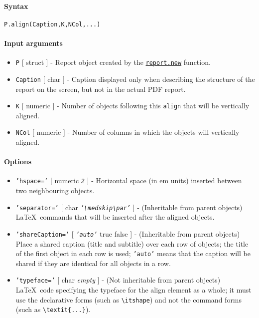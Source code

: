 


	\paragraph{Syntax}

\begin{verbatim}
P.align(Caption,K,NCol,...)
\end{verbatim}

\paragraph{Input arguments}

\begin{itemize}
\item
  \texttt{P} {[} struct {]} - Report object created by the
  \href{report/new}{\texttt{report.new}} function.
\item
  \texttt{Caption} {[} char {]} - Caption displayed only when describing
  the structure of the report on the screen, but not in the actual PDF
  report.
\item
  \texttt{K} {[} numeric {]} - Number of objects following this
  \texttt{align} that will be vertically aligned.
\item
  \texttt{NCol} {[} numeric {]} - Number of columns in which the objects
  will vertically aligned.
\end{itemize}

\paragraph{Options}

\begin{itemize}
\item
  \texttt{'hspace='} {[} numeric \textbar{} \emph{\texttt{2}} {]} -
  Horizontal space (in em units) inserted between two neighbouring
  objects.
\item
  \texttt{'separator='} {[} char \textbar{}
  \emph{\texttt{'\textbackslash{}medskip\textbackslash{}par'}} {]} -
  (Inheritable from parent objects) \LaTeX~commands that will be
  inserted after the aligned objects.
\item
  \texttt{'shareCaption='} {[} \emph{\texttt{'auto'}} \textbar{} true
  \textbar{} false {]} - (Inheritable from parent objects) Place a
  shared caption (title and subtitle) over each row of objects; the
  title of the first object in each row is used; \texttt{'auto'} means
  that the caption will be shared if they are identical for all objects
  in a row.
\item
  \texttt{'typeface='} {[} char \textbar{} \emph{empty} {]} - (Not
  inheritable from parent objects) \LaTeX~code specifying the typeface
  for the align element as a whole; it must use the declarative forms
  (such as \texttt{\textbackslash{}itshape}) and not the command forms
  (such as \texttt{\textbackslash{}textit\{...\}}).
\end{itemize}

